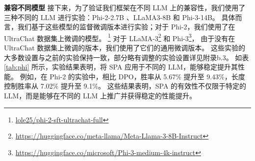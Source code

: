 \textbf{兼容不同模型} 
接下来，为了验证我们框架在不同 LLM 上的兼容性，我们使用了三种不同的 LLM 进行实验：Phi-2-2.7B \citep{li2023textbooks}、LLaMA3-8B \citep{dubey2024llama} 和 Phi-3-14B。
具体而言，我们基于这些模型的监督微调版本进行实验；对于 Phi-2，我们使用了在 UltraChat 数据集上微调的模型。
\footnote{\url{lole25/phi-2-sft-ultrachat-full}} 
对于 LLaMA-3\footnote{\url{https://huggingface.co/meta-llama/Meta-Llama-3-8B-Instruct}} 
和 Phi-3\footnote{\url{https://huggingface.co/microsoft/Phi-3-medium-4k-instruct}}，
由于没有在 UltraChat 数据集上微调的版本，我们使用了它们的通用微调版本。
这些实验的大多数设置与之前的实验保持一致，部分略有调整的实验设置详见附录b.3。%
如表 \ref{tab:phi} 所示，实验结果表明，将 SPA 应用于不同的 LLM，能够稳定提升其性能。
例如，在 Phi-2 的实验中，相比 DPO，胜率从 5.67\% 提升至 9.43\%，长度控制胜率从 7.02\% 提升至 9.1\%。
这些结果表明，SPA 的有效性不仅限于特定的 LLM，而是能够在不同的 LLM 上推广并获得稳定的性能提升。

